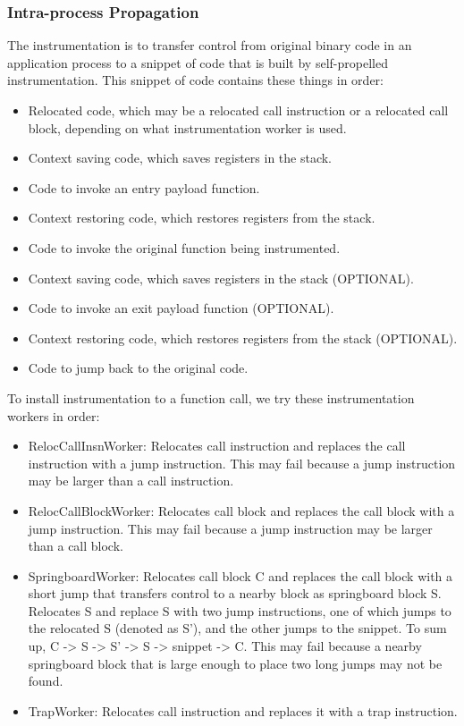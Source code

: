 \subsubsection{Intra-process Propagation} \label{sec:intrainst}

The instrumentation is to transfer control from original binary code in an
application process to a snippet of code that is built by self-propelled
instrumentation. This snippet of code contains these things in order:
\begin{itemize}
\item Relocated code, which may be a relocated call instruction or a relocated
  call block, depending on what instrumentation worker is used.
\item Context saving code, which saves registers in the stack.
\item Code to invoke an entry payload function.
\item Context restoring code, which restores registers from the stack.
\item Code to invoke the original function being instrumented.
\item Context saving code, which saves registers in the stack (OPTIONAL).
\item Code to invoke an exit payload function (OPTIONAL).
\item Context restoring code, which restores registers from the stack (OPTIONAL).
\item Code to jump back to the original code.
\end{itemize}

To install instrumentation to a function call, we try these instrumentation
workers in order:
\begin{itemize}
\item RelocCallInsnWorker: Relocates call instruction and replaces the call
  instruction with a jump instruction. This may fail because a jump instruction
  may be larger than a call instruction.
\item RelocCallBlockWorker: Relocates call block and replaces the call block with
  a jump instruction. This may fail because a jump instruction may be larger
  than a call block.
\item SpringboardWorker: Relocates call block C and replaces the call block with
  a short jump that transfers control to a nearby block as springboard block
  S. Relocates S and replace S with two jump instructions, one of which jumps to
  the relocated S (denoted as S'), and the other jumps to the snippet. To sum
  up, C -> S -> S' -> S -> snippet -> C. This may fail because a nearby springboard
  block that is large enough to place two long jumps may not be found.
\item TrapWorker: Relocates call instruction and replaces it with a trap
  instruction.
\end{itemize}

